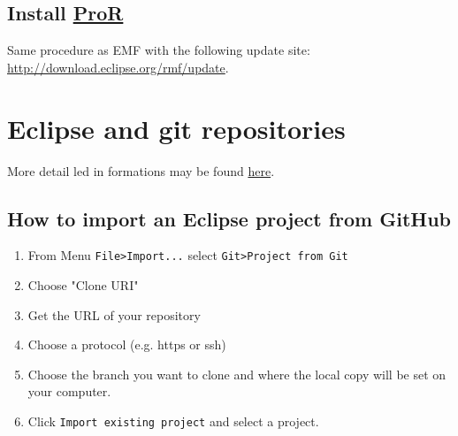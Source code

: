 \documentclass{openetcs_report}
\begin{document}
\subsection{Install \href{http://www.eclipse.org/rmf/pror/}{ProR}}
Same procedure as EMF with the following update site:
\url{http://download.eclipse.org/rmf/update}.

\section{Eclipse and  git repositories}
More detail led in formations may be found \href{http://www.vogella.com/articles/EGit/article.html}{here}.
\subsection{How to import an Eclipse project from GitHub}
\begin{enumerate}
\item From Menu 
\verb+File>Import...+ select \verb+Git>Project from Git+
\item Choose "Clone URI"
\item Get the URL of your repository
\item Choose a protocol (e.g. https or ssh)
\item Choose the branch you want to clone and where the local copy
  will be set on your computer.
\item Click \verb+Import existing project+ and  select a project.

\end{enumerate}



\end{document}

